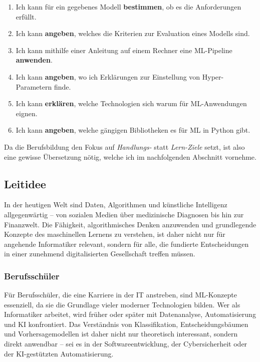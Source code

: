 \documentclass[twocolumn]{article}
\begin{document}
\begin{enumerate}[label=\arabic{mainnum}.\arabic*, nosep]

    \item Ich kann für ein gegebenes Modell \textbf{bestimmen}, ob es die Anforderungen erfüllt.
    \item Ich kann \textbf{angeben}, welches die Kriterien zur Evaluation eines Modells sind.


    \item Ich kann mithilfe einer Anleitung auf einem Rechner eine ML-Pipeline \textbf{anwenden}.
    \item Ich kann \textbf{angeben}, wo ich Erklärungen zur Einstellung von Hyper-Parametern finde.


    \item Ich kann \textbf{erklären}, welche Technologien sich warum für ML-Anwendungen eignen.
    \item Ich kann \textbf{angeben}, welche gängigen Bibliotheken es für ML in Python gibt.
    
\end{enumerate}


Da die Berufsbildung den Fokus auf \textit{Handlungs-} statt \textit{Lern-Ziele} setzt, ist also eine gewisse Übersetzung nötig, welche ich im nachfolgenden Abschnitt vornehme.

\subsection{Leitidee}
In der heutigen Welt sind Daten, Algorithmen und künstliche Intelligenz allgegenwärtig – von sozialen Medien über medizinische Diagnosen bis hin zur Finanzwelt. Die Fähigkeit, algorithmisches Denken anzuwenden und grundlegende Konzepte des maschinellen Lernens zu verstehen, ist daher nicht nur für angehende Informatiker relevant, sondern für alle, die fundierte Entscheidungen in einer zunehmend digitalisierten Gesellschaft treffen müssen.

\subsubsection{Berufsschüler}

Für Berufsschüler, die eine Karriere in der IT anstreben, sind ML-Konzepte essenziell, da sie die Grundlage vieler moderner Technologien bilden. Wer als Informatiker arbeitet, wird früher oder später mit Datenanalyse, Automatisierung und KI konfrontiert. Das Verständnis von Klassifikation, Entscheidungsbäumen und Vorhersagemodellen ist daher nicht nur theoretisch interessant, sondern direkt anwendbar – sei es in der Softwareentwicklung, der Cybersicherheit oder der KI-gestützten Automatisierung.
\end{document}
